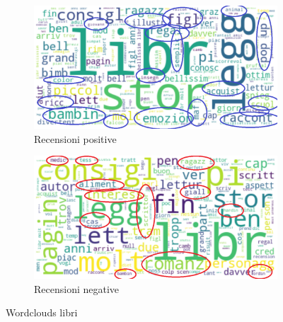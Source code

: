 				\begin{figure} [h]
					\centering
					\begin{subfigure}{0.48\textwidth}
						\includegraphics[width=\textwidth]{Figure/top_positive_books}
						\caption{Recensioni positive}
						\label{fig:top_positive_books}
					\end{subfigure}
					\begin{subfigure}{0.48\textwidth}
						\includegraphics[width=\textwidth]{Figure/top_negative_books}
						\caption{Recensioni negative}
						\label{fig:top_negative_books}
					\end{subfigure}
					\caption{Wordclouds libri}\label{fig:wordclouds_book}
				\end{figure}
				
